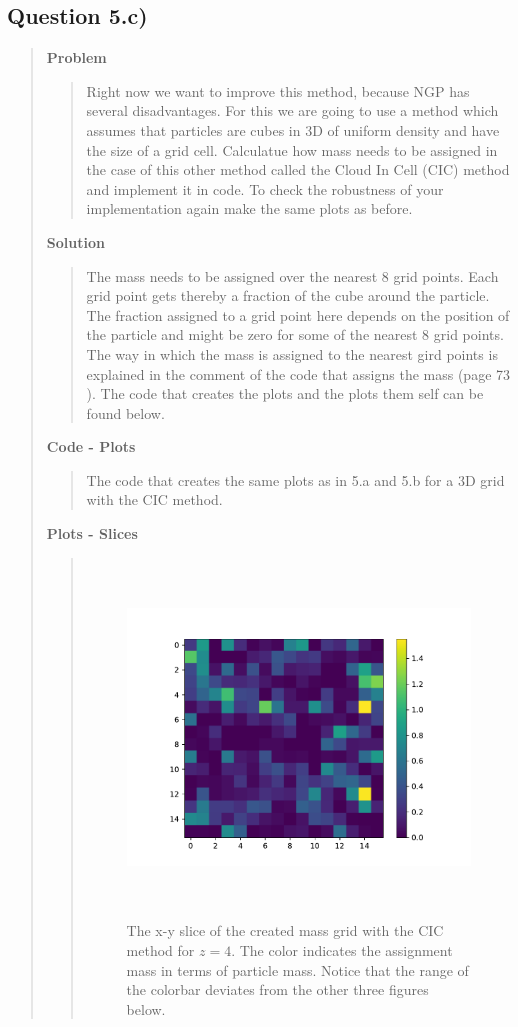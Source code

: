 
\subsection*{\textbf{Question 5.c)}}
\begin{quote}

\textbf{Problem}
\begin{quote}
Right now we want to improve this method, because NGP has several disadvantages. For this we are going to use a method which assumes that particles are cubes in 3D of uniform density and have the size of a grid cell. Calculatue how mass needs to be assigned in the case of this other method called the Cloud In Cell (CIC) method and implement it in code. To check the robustness of your implementation again make the same plots as before.
\end{quote}

\textbf{Solution} 
\begin{quote}
The mass needs to be assigned over the nearest 8 grid points. Each grid point gets thereby a fraction of the cube around the particle. The fraction assigned to a grid point here depends on the position of the particle and might be zero for some of the nearest 8 grid points. The way in which the mass is assigned to the nearest gird points is explained in the comment of the code that assigns the mass (page 73 ). The code that creates the plots and the plots them self can be found below.
\newpage
\end{quote}

\textbf{Code - Plots}
\begin{quote}
The code that creates the same plots as in 5.a and 5.b for a 3D grid with the CIC method.

\end{quote}

\newpage


\textbf{Plots - Slices}
\begin{quote}
\begin{figure}[!ht]
\centering
\includegraphics[width=14cm, height=9.5cm]{./Plots/5c_slice_4.pdf}
\caption{The x-y slice of the created mass grid with the CIC method for $z = 4$. The color indicates the assignment mass in terms of particle mass. Notice that the range of the colorbar deviates from the other three figures below.}
\end{figure}


\end{quote}
\end{quote}
